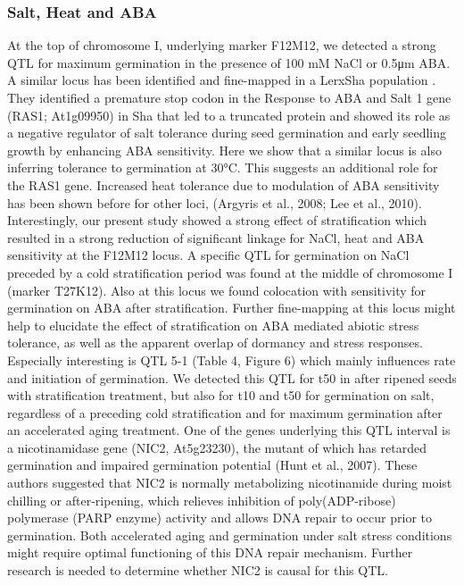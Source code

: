 \subsubsection{Salt, Heat and ABA}
At the top of chromosome I, underlying marker F12M12, we detected a strong QTL for maximum germination in 
the presence of 100 mM NaCl or 0.5μm ABA. A similar locus has been identified and fine-mapped in a 
LerxSha population \cite{Ren:2010}. They identified a premature stop codon in the Response to ABA and 
Salt 1 gene (RAS1; At1g09950) in Sha that led to a truncated protein and showed its role as a negative 
regulator of salt tolerance during seed germination and early seedling growth by enhancing ABA 
sensitivity. Here we show that a similar locus is also inferring tolerance to germination at 30°C. 
This suggests an additional role for the RAS1 gene. Increased heat tolerance due to modulation of 
ABA sensitivity has been shown before for other loci, (Argyris et al., 2008; Lee et al., 2010). 
Interestingly, our present study showed a strong effect of stratification which resulted in a strong 
reduction of significant linkage for NaCl, heat and ABA sensitivity at the F12M12 locus. A specific 
QTL for germination on NaCl preceded by a cold stratification period was found at the middle of 
chromosome I (marker T27K12). Also at this locus we found colocation with sensitivity for germination 
on ABA after stratification. Further fine-mapping at this locus might help to elucidate the effect 
of stratification on ABA mediated abiotic stress tolerance, as well as the apparent overlap of 
dormancy and stress responses. Especially interesting is QTL 5-1 (Table 4, Figure 6) which mainly 
influences rate and initiation of germination. We detected this QTL for t50 in after ripened seeds 
with stratification treatment, but also for t10 and t50 for germination on salt, regardless of a 
preceding cold stratification and for maximum germination after an accelerated aging treatment. 
One of the genes underlying this QTL interval is a nicotinamidase gene (NIC2, At5g23230), the mutant 
of which has retarded germination and impaired germination potential (Hunt et al., 2007). These 
authors suggested that NIC2 is normally metabolizing nicotinamide during moist chilling or 
after-ripening, which relieves inhibition of poly(ADP-ribose) polymerase (PARP enzyme) activity and 
allows DNA repair to occur prior to germination. Both accelerated aging and germination under salt 
stress conditions might require optimal functioning of this DNA repair mechanism. Further research 
is needed to determine whether NIC2 is causal for this QTL.

